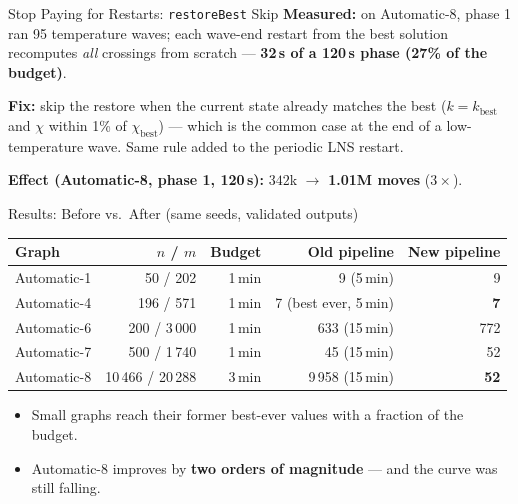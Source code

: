 \begin{frame}{Stop Paying for Restarts: \texttt{restoreBest} Skip}
  \textbf{Measured:} on Automatic-8, phase 1 ran 95 temperature waves; each wave-end restart
  from the best solution recomputes \emph{all} crossings from scratch ---
  \textbf{32\,s of a 120\,s phase (27\% of the budget)}.
  \medskip

  \textbf{Fix:} skip the restore when the current state already matches the best
  ($k = k_{\text{best}}$ and $\chi$ within 1\% of $\chi_{\text{best}}$) --- which is the common case
  at the end of a low-temperature wave. Same rule added to the periodic LNS restart.
  \medskip

  \textbf{Effect (Automatic-8, phase 1, 120\,s):} $342$k $\to$ \textbf{1.01M moves} ($3\times$).
\end{frame}

\begin{frame}{Results: Before vs.\ After (same seeds, validated outputs)}
  \begin{center}
    \begin{tabular}{lrrrr}
      \toprule
      \textbf{Graph} & $n$ / $m$ & \textbf{Budget} & \textbf{Old pipeline} & \textbf{New pipeline} \\
      \midrule
      Automatic-1 & 50 / 202        & 1\,min  & 9 (5\,min)        & 9 \\
      Automatic-4 & 196 / 571       & 1\,min  & 7 (best ever, 5\,min) & \textbf{7} \\
      Automatic-6 & 200 / 3\,000    & 1\,min  & 633 (15\,min)     & 772 \\
      Automatic-7 & 500 / 1\,740    & 1\,min  & 45 (15\,min)      & 52 \\
      Automatic-8 & 10\,466 / 20\,288 & 3\,min & 9\,958 (15\,min) & \textbf{52} \\
      \bottomrule
    \end{tabular}
  \end{center}
  \medskip
  \begin{itemize}
    \item Small graphs reach their former best-ever values with a fraction of the budget.
    \item Automatic-8 improves by \textbf{two orders of magnitude} --- and the curve was still falling.
  \end{itemize}
\end{frame}

